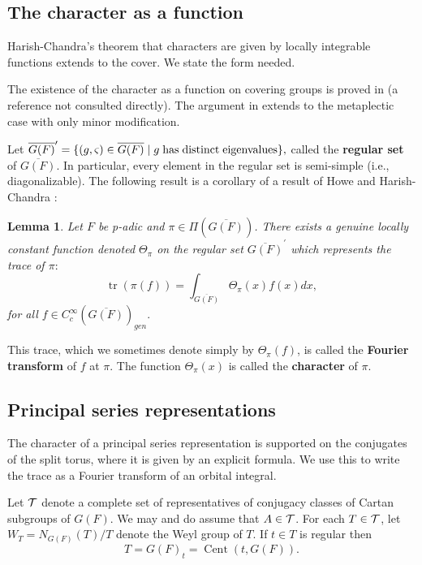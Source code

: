 \documentclass[12pt,letterpaper,openany]{book}
\theoremstyle{plain}
\newtheorem{lemma}[theorem]{Lemma}
\theoremstyle{definition}
\theoremstyle{remark}
\theoremstyle{remark}
\newcommand{\tr}{\operatorname{tr}}
\begin{document}
\subsection{The character as a function}

Harish-Chandra's theorem that characters are given by locally integrable functions extends to the cover. We state the form needed.


The existence of the character as a function on covering groups is proved
in \cite{Li12} (a reference not consulted directly).
The argument in \cite{S} extends to the metaplectic case with only
minor modification.

Let $\overline{G(F)}^{\prime }=\{(g,\varsigma )\in \overline{G(F)}%
\;|\;g\;{\rm has\;distinct\;eigenvalues}\},$ called the {\bf regular set} of
$\overline{G(F)}.$ In particular, every element in the regular set is
semi-simple (i.e., diagonalizable). The following result is a corollary of a
result of Howe and Harish-Chandra \cite{S}:

\begin{lemma}
Let $F$ be p-adic and $\pi\in\Pi(\overline{G(F)})$.
There exists a genuine locally constant function denoted $\Theta _\pi $ on
the regular set $\overline{G(F)}^{\prime }$ which represents the trace of $%
\pi :$%
\[
\tr(\pi (f))=\int_{\overline{G(F)}}\Theta _\pi (x)f(x)dx,
\]
for all $f\in C_c^\infty (\overline{G(F)})_{gen}.$
\end{lemma}

This trace, which we sometimes denote simply by $\Theta _\pi (f)$, is called
the {\bf Fourier transform} of $f$ at $\pi $. The function $\Theta _\pi (x)$
is called the {\bf character} of $\pi $.

\subsection{Principal series representations}\label{sec:ps-char}

The character of a principal series representation is supported on the conjugates of the split torus, where it is given by an explicit formula. We use this to write the trace as a Fourier transform of an orbital integral.


Let ${\cal T}$ denote a complete set of representatives of conjugacy classes of
Cartan subgroups of $G(F)$. We may and do assume that $A\in {\cal T}$. For each
$T\in {\cal T}$, let $W_T=N_{G(F)}(T)/T$ denote the Weyl
group of $T$. If $t\in T$ is regular then
\[
T=G(F)_t=\operatorname{Cent}(t,G(F)).
\]
\end{document}
